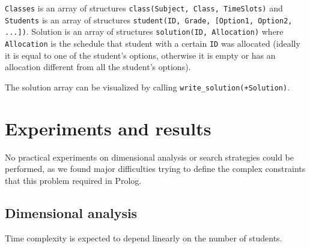 \documentclass[runningheads]{llncs}
\begin{document}
\texttt{Classes} is an array of structures \texttt{class(Subject, Class, TimeSlots)} and \texttt{Students} is an array of structures \texttt{student(ID, Grade, [Option1, Option2, ...])}. Solution is an array of structures \texttt{solution(ID, Allocation)} where \texttt{Allocation} is the schedule that student with a certain \texttt{ID} was allocated (ideally it is equal to one of the student's options, otherwise it is empty or has an allocation different from all the student's options).

The solution array can be visualized by calling \texttt{write\_solution(+Solution)}.

\section{Experiments and results}

No practical experiments on dimensional analysis or search strategies could be performed, as we found major difficulties trying to define the complex constraints that this problem required in Prolog.

\subsection{Dimensional analysis}

Time complexity is expected to depend linearly on the number of students.
\end{document}
